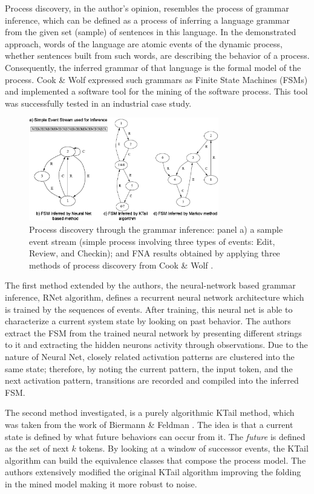 \documentclass{sig-alternate}
\begin{document}
Process discovery, in the author's opinion, resembles the process of grammar inference, which can be defined as a process of inferring a language grammar from the given set (sample) of sentences in this language. In the demonstrated approach, words of the language are atomic events of the dynamic process, whether sentences built from such words, are describing the behavior of a process. Consequently, the inferred grammar of that language is the formal model of the process. Cook \& Wolf expressed such grammars as Finite State Machines (FSMs) and implemented a software tool for the mining of the software process. This tool was successfully tested in an industrial case study.

\begin{figure}[tbp]
   \centering
   \includegraphics[height=45mm]{inference.eps}
   \caption{Process discovery through the grammar inference: panel a) a sample event stream (simple process involving three types of events: Edit, Review, and Checkin); and FNA results obtained by applying three methods of process discovery from Cook \& Wolf \cite{citeulike:328044}.}
   \label{fig:inference}
\end{figure}

The first method extended by the authors, the neural-network based grammar inference, RNet algorithm, defines a recurrent neural network architecture which is trained by the sequences of events. After training, this neural net is able to characterize a current system state by looking on past behavior. The authors extract the FSM from the trained neural network by presenting different strings to it and extracting the hidden neurons activity through observations. Due to the nature of Neural Net, closely related activation patterns are clustered into the same state; therefore, by noting the current pattern, the input token, and the next activation pattern, transitions are recorded and compiled into the inferred FSM.

The second method investigated, is a purely algorithmic KTail method, which was taken from the work of Biermann \& Feldman \cite{citeulike:5120603}. The idea is that a current state is defined by what future behaviors can occur from it. The \textit{future} is defined as the set of next $k$ tokens. By looking at a window of successor events, the KTail algorithm can build the equivalence classes that compose the process model. The authors extensively modified the original KTail algorithm improving the folding in the mined model making it more robust to noise.
\end{document}
